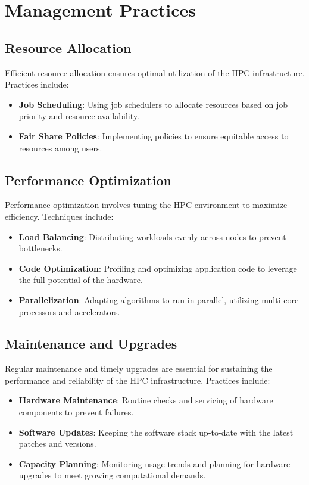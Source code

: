 \section{Management Practices}

\subsection{Resource Allocation}

Efficient resource allocation ensures optimal utilization of the HPC infrastructure. Practices include:

\begin{itemize}
    \item \textbf{Job Scheduling}: Using job schedulers to allocate resources based on job priority and resource availability.
    \item \textbf{Fair Share Policies}: Implementing policies to ensure equitable access to resources among users.
\end{itemize}

\subsection{Performance Optimization}

Performance optimization involves tuning the HPC environment to maximize efficiency. Techniques include:

\begin{itemize}
    \item \textbf{Load Balancing}: Distributing workloads evenly across nodes to prevent bottlenecks.
    \item \textbf{Code Optimization}: Profiling and optimizing application code to leverage the full potential of the hardware.
    \item \textbf{Parallelization}: Adapting algorithms to run in parallel, utilizing multi-core processors and accelerators.
\end{itemize}

\subsection{Maintenance and Upgrades}

Regular maintenance and timely upgrades are essential for sustaining the performance and reliability of the HPC infrastructure. Practices include:

\begin{itemize}
    \item \textbf{Hardware Maintenance}: Routine checks and servicing of hardware components to prevent failures.
    \item \textbf{Software Updates}: Keeping the software stack up-to-date with the latest patches and versions.
    \item \textbf{Capacity Planning}: Monitoring usage trends and planning for hardware upgrades to meet growing computational demands.
\end{itemize}

